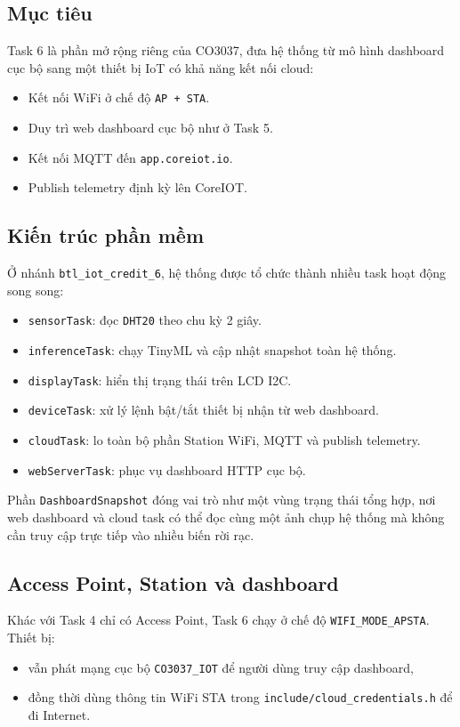 \documentclass[12pt,a4paper]{article}
\begin{document}
\subsection{Mục tiêu}

Task 6 là phần mở rộng riêng của CO3037, đưa hệ thống từ mô hình dashboard cục bộ sang một thiết bị IoT có khả năng kết nối cloud:
\begin{itemize}
  \item Kết nối WiFi ở chế độ \texttt{AP + STA}.
  \item Duy trì web dashboard cục bộ như ở Task 5.
  \item Kết nối MQTT đến \texttt{app.coreiot.io}.
  \item Publish telemetry định kỳ lên CoreIOT.
\end{itemize}

\subsection{Kiến trúc phần mềm}

Ở nhánh \texttt{btl\_iot\_credit\_6}, hệ thống được tổ chức thành nhiều task hoạt động song song:
\begin{itemize}
  \item \texttt{sensorTask}: đọc \texttt{DHT20} theo chu kỳ 2 giây.
  \item \texttt{inferenceTask}: chạy TinyML và cập nhật snapshot toàn hệ thống.
  \item \texttt{displayTask}: hiển thị trạng thái trên LCD I2C.
  \item \texttt{deviceTask}: xử lý lệnh bật/tắt thiết bị nhận từ web dashboard.
  \item \texttt{cloudTask}: lo toàn bộ phần Station WiFi, MQTT và publish telemetry.
  \item \texttt{webServerTask}: phục vụ dashboard HTTP cục bộ.
\end{itemize}

Phần \texttt{DashboardSnapshot} đóng vai trò như một vùng trạng thái tổng hợp, nơi web dashboard và cloud task có thể đọc cùng một ảnh chụp hệ thống mà không cần truy cập trực tiếp vào nhiều biến rời rạc.

\subsection{Access Point, Station và dashboard}

Khác với Task 4 chỉ có Access Point, Task 6 chạy ở chế độ \texttt{WIFI\_MODE\_APSTA}. Thiết bị:
\begin{itemize}
  \item vẫn phát mạng cục bộ \texttt{CO3037\_IOT} để người dùng truy cập dashboard,
  \item đồng thời dùng thông tin WiFi STA trong \texttt{include/cloud\_credentials.h} để đi Internet.
\end{itemize}
\end{document}
